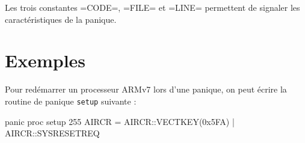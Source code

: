 Les trois constantes \plm=CODE=, \plm=FILE= et \plm=LINE= permettent de signaler les caractéristiques de la panique.


\section{Exemples}

Pour redémarrer un processeur ARMv7 lors d'une panique, on peut écrire la routine de panique \texttt{setup} suivante :
\begin{PLM}
panic proc setup 255 {
  AIRCR = AIRCR::VECTKEY(0x5FA) | AIRCR::SYSRESETREQ
}
\end{PLM}

